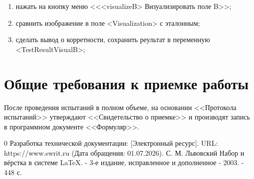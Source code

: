 \documentclass[14pt,a4paper,final]{extreport}
\begin{document}
\begin{enumerate}[label=\arabic*.]
\begin{enumerate}[label*=\arabic*.,
                      leftmargin=1.5cm, %
                      labelsep=0.5cm]
    \item нажать на кнопку меню <<<visualizeB> Визуализировать поле B>>;
    \item сравнить изображение в поле <Visualization> с эталонным;
    \item сделать вывод о корретности, сохранить реультат в переменную <TestResultVisualB>;
    \end{enumerate}

\end{enumerate}



\section{Общие требования к приемке работы}
После проведения испытаний в полном объеме, на основании <<Протокола испытаний>> утверждают <<Свидетельство о приемке>> и производят запись в программном документе <<Формуляр>>.


\pagebreak

\fancyhead[C]{\bfseries\thepage\\\docstamp}  %

\begin{thebibliography}{0}
	 Разработка технической документации: [Электронный ресурс]. URL:
	https://www.swrit.ru (Дата обращения: 01.07.2026).
	 С. М. Львовский Набор и вёрстка в системе \LaTeX. - 3-е издание, исправленное и дополненное - 2003. - 448 с.
\end{thebibliography}
\pagebreak

\label{lastpage}
\end{document}
